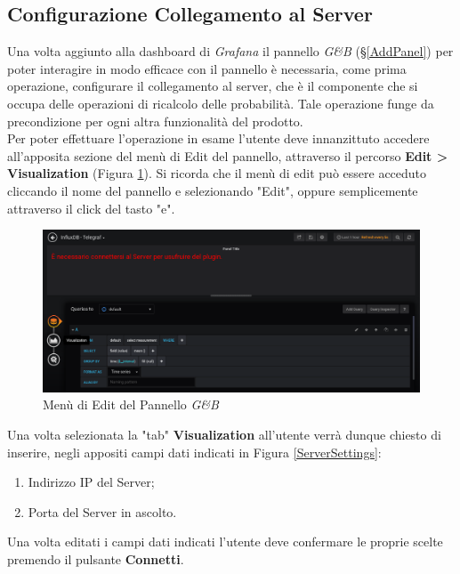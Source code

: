 \subsection{Configurazione Collegamento al Server}\label{CCS}

Una volta aggiunto alla dashboard di \textit{Grafana} il pannello \textit{G\&B} (§\ref{AddPanel}) per poter interagire in modo efficace con il pannello è necessaria, come prima operazione, configurare il collegamento al server, che è il componente che si occupa delle operazioni di ricalcolo delle probabilità. Tale operazione funge da precondizione per ogni altra funzionalità del prodotto.\\
Per poter effettuare l'operazione in esame l'utente deve innanzittuto accedere all'apposita sezione del menù di Edit del pannello, attraverso il percorso \textbf{Edit > Visualization} (Figura \ref{EditMenu}). Si ricorda che il menù di edit può essere acceduto cliccando il nome del pannello e selezionando "Edit", oppure semplicemente attraverso il click del tasto "e".

\begin{figure}[H]
	\begin{center}
		\includegraphics[scale=0.31]{./images/VisualizServerSettings.png}
		 \caption{Menù di Edit del Pannello \textit{G\&B}}	
		 \label{EditMenu}
	\end{center}
\end{figure}

Una volta selezionata la "tab" \textbf{Visualization} all'utente verrà dunque chiesto di inserire, negli appositi campi dati indicati in Figura \ref{ServerSettings}:
\begin{enumerate}
	\item Indirizzo IP del Server;
	\item Porta del Server in ascolto.
\end{enumerate}
Una volta editati i campi dati indicati l'utente deve confermare le proprie scelte premendo il pulsante \textbf{Connetti}.\\

